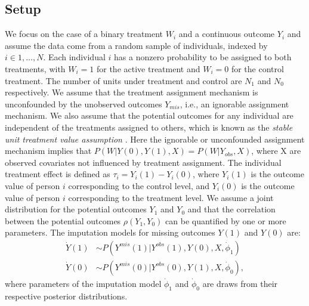 	\subsection{Setup}  
We focus on the case of a binary treatment $W_{i}$ and a continuous outcome $Y_{i}$ and assume the data come from a random sample of individuals, indexed by $i \in {1,\dots,N}$. Each individual $i$ has a nonzero probability to be assigned to both treatments, with $W_{i} = 1$ for the active treatment and $W_{i} = 0$ for the control treatment. The number of units under treatment and control are $N_{1}$ and $N_{0}$ respectively. We assume that the treatment assignment mechanism is unconfounded by the unobserved outcomes $Y_{mis}$, i.e., an ignorable assignment mechanism. We also assume that the potential outcomes for any individual are independent of the treatments assigned to others, which is known as the \emph{stable unit treatment value assumption} \citep{imbens2015causal}. Here the ignorable or unconfounded assignment mechanism implies that $P(W|Y(0), Y(1), X) = P(W|Y_{obs}, X)$, where X are observed covariates not influenced by treatment assignment. The individual treatment effect is defined as $\tau_{i} = Y_{i}(1) - Y_{i}(0)$, where $Y_{i}(1)$ is the outcome value of person $i$ corresponding to the control level, and $Y_{i}(0)$ is the outcome value of person $i$ corresponding to the treatment level. We assume a joint distribution for the potential outcomes $Y_{1}$ and $Y_{0}$ and that the correlation between the potential outcomes $\rho(Y_{1}, Y_{0})$ can be quantified by one or more parameters. The imputation models for missing outcomes $Y(1)$ and $Y(0)$ are: 
\begin{align}
	\dot{Y}(1) &\sim P(Y^{mis}(1)|Y^{obs}(1), Y(0), X, \dot{\phi}_{1})\\
	\dot{Y}(0) &\sim P(Y^{mis}(0)|Y^{obs}(0), Y(1), X, \dot{\phi}_{0}),
\end{align}
where parameters of the imputation model $\dot{\phi}_{1}$ and $\dot{\phi}_{0}$ are draws from their respective posterior distributions.
